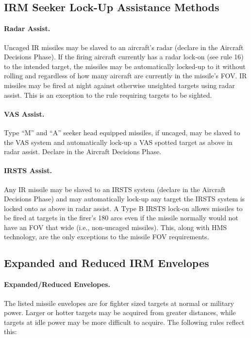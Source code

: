 \subsection{IRM Seeker Lock-Up Assistance Methods}

\paragraph{Radar Assist.} Uncaged IR missiles may be slaved to an aircraft's radar (declare in the Aircraft Decisions Phase). If the firing aircraft currently has a radar lock-on (see rule 16) to the intended target, the missiles may be automatically locked-up to it without rolling and regardless of how many aircraft are currently in the missile's FOV. IR missiles may be fired at night against otherwise unsighted targets using radar assist. This is an exception to the rule requiring targets to be sighted.

\paragraph{VAS Assist.} Type “M” and “A” seeker head equipped missiles, if uncaged, may be slaved to the VAS system and automatically lock-up a VAS spotted target as above in radar assist. Declare in the Aircraft Decisions Phase.

\paragraph{IRSTS Assist.} Any IR missile may be slaved to an IRSTS system (declare in the Aircraft Decisions Phase) and may automatically lock-up any target the IRSTS system is locked onto as above in radar assist. A Type B IRSTS lock-on allows missiles to be fired at targets in the firer's 180 arcs even if the missile normally would not have an FOV that wide (i.e., non-uncaged missiles). This, along with HMS technology, are the only exceptions to the missile FOV requirements.

\subsection{Expanded and Reduced IRM Envelopes}

\paragraph{Expanded/Reduced Envelopes.} The listed missile envelopes are for fighter sized targets at normal or military power. Larger or hotter targets may be acquired from greater distances, while targets at idle power may be more difficult to acquire. The following rules reflect this:

